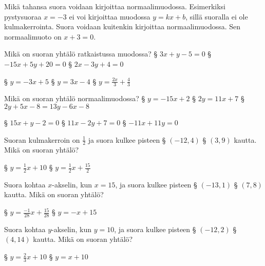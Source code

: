 Mikä tahansa suora voidaan kirjoittaa normaalimuodossa. Esimerkiksi pystysuoraa $x=-3$ ei voi kirjoittaa muodossa $y=kx+b$, sillä suoralla ei ole kulmakerrointa. Suora voidaan kuitenkin kirjoittaa normaalimuodossa. Sen normaalimuoto on $x+3=0$.

\begin{tehtavasivu}

\sarjaA %

\begin{tehtava}
Mikä on suoran yhtälö ratkaistussa muodossa?
\alakohdat
§ $3x + y -5 = 0$
§ $-15x + 5y + 20 =0$
§ $2x - 3y + 4 = 0$
\loppu
\begin{vastaus}
\alakohdat
§ $y=-3x+5$
§ $y=3x-4$
§ $y=\frac{2x}{3} + \frac{4}{3}$
\loppu
\end{vastaus}
\end{tehtava}

\begin{tehtava}
Mikä on suoran yhtälö normaalimuodossa?
\alakohdat
§ $y=-15x+2$
§ $2y=11x+7$
§ $2y+5x-8=13y-6x-8$
\loppu
\begin{vastaus}
\alakohdat
§ $15x+y-2=0$
§ $11x-2y+7=0$
§ $-11x+11y=0$
\loppu
\end{vastaus}
\end{tehtava}

\begin{tehtava}
Suoran kulmakerroin on $\frac{1}{2}$ ja suora kulkee pisteen
\alakohdat
§ $(-12, 4)$
§ $(3, 9)$
\loppu
kautta. Mikä on suoran yhtälö?
\begin{vastaus}
\alakohdat
§ $y=\frac{1}{2}x+10$
§ $y=\frac{1}{2}x+\frac{15}{2}$
\loppu
\end{vastaus}
\end{tehtava}

\begin{tehtava}
Suora kohtaa $x$-akselin, kun $x=15$, ja suora kulkee pisteen
\alakohdat
§ $(-13, 1)$
§ $(7, 8)$
\loppu
kautta. Mikä on suoran yhtälö?
\begin{vastaus}
\alakohdat
§ $y=\frac{-1}{28}x+\frac{15}{28}$
§ $y=-x+15$
\loppu
\end{vastaus}
\end{tehtava}

\begin{tehtava}
Suora kohtaa $y$-akselin, kun $y=10$, ja suora kulkee pisteen
\alakohdat
§ $(-12, 2)$
§ $(4, 14)$
\loppu
kautta. Mikä on suoran yhtälö?
\begin{vastaus}
\alakohdat
§ $y=\frac{2}{3}x+10$
§ $y=x+10$
\loppu
\end{vastaus}
\end{tehtava}


\end{tehtavasivu}
